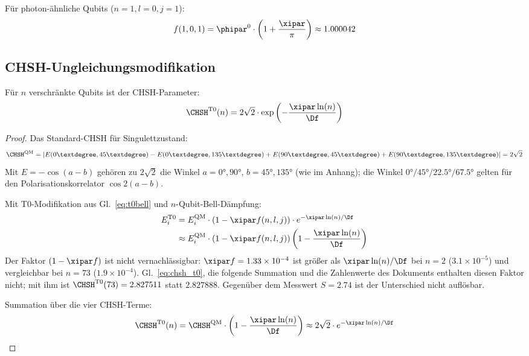 Für photon-ähnliche Qubits ($n=1, l=0, j=1$):
\begin{equation}
	f(1,0,1) = \phipar^0 \cdot \left(1 + \frac{\xipar}{\pi}\right) \approx 1.000042
\end{equation}

\subsection{CHSH-Ungleichungsmodifikation}

\begin{proposition}
	Für $n$ verschränkte Qubits ist der CHSH-Parameter:
	\begin{equation}
		\CHSH^{\text{T0}}(n) = 2\sqrt{2} \cdot \exp\left(-\frac{\xipar \ln(n)}{\Df}\right)
		\label{eq:chsh_t0}
	\end{equation}
\end{proposition}

\begin{proof}
	Das Standard-CHSH für Singulettzustand:
	\begin{equation}
		\CHSH^{\text{QM}} = |E(0°, 45°) - E(0°, 135°) + E(90°, 45°) + E(90°, 135°)| = 2\sqrt{2}
	\end{equation}
	Mit $E = -\cos(a-b)$ gehören zu $2\sqrt{2}$ die Winkel $a = 0°, 90°$, $b = 45°, 135°$ (wie im Anhang); die Winkel $0°/45°/22.5°/67.5°$ gelten für den Polarisationskorrelator $\cos 2(a-b)$.
	
	Mit T0-Modifikation aus Gl.~\eqref{eq:t0bell} und $n$-Qubit-Bell-Dämpfung:
	\begin{align}
		E^{\text{T0}}_i &= E^{\text{QM}}_i \cdot \left(1 - \xipar f(n,l,j)\right) \cdot e^{-\xipar\ln(n)/\Df} \\
		&\approx E^{\text{QM}}_i \cdot \left(1 - \xipar f(n,l,j)\right) \left(1 - \frac{\xipar \ln(n)}{\Df}\right)
	\end{align}
	Der Faktor $(1 - \xipar f)$ ist nicht vernachlässigbar: $\xipar f = 1.33\times10^{-4}$ ist größer als $\xipar\ln(n)/\Df$ bei $n = 2$ ($3.1\times10^{-5}$) und vergleichbar bei $n = 73$ ($1.9\times10^{-4}$). Gl.~\eqref{eq:chsh_t0}, die folgende Summation und die Zahlenwerte des Dokuments enthalten diesen Faktor nicht; mit ihm ist $\CHSH^{\text{T0}}(73) = 2.827511$ statt $2.827888$. Gegenüber dem Messwert $S = 2.74$ ist der Unterschied nicht auflösbar.
	
	Summation über die vier CHSH-Terme:
	\begin{equation}
		\CHSH^{\text{T0}}(n) = \CHSH^{\text{QM}} \cdot \left(1 - \frac{\xipar \ln(n)}{\Df}\right) \approx 2\sqrt{2} \cdot e^{-\xipar\ln(n)/\Df}
	\end{equation}
\end{proof}

